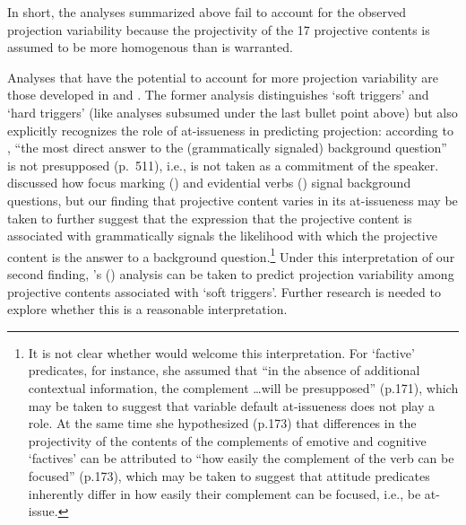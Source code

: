 \documentclass[11pt,fleqn]{article}
\newcommand{\6}{\mbox{$[\hspace*{-.6mm}[$}}
\newcommand{\9}{\mbox{$]\hspace*{-.6mm}]$}}
\newcommand{\citetpos}[1]{\citeauthor{#1}'s (\citeyear{#1})}
\begin{document}
In short, the analyses summarized above fail to account for the observed projection variability because the projectivity of the 17 projective contents is assumed to be more homogenous than is warranted. 

Analyses that have the potential to account for more projection variability are those developed in \citealt{abrusan2011} and \citealt{abrusan2016}. The former analysis distinguishes `soft triggers' and `hard triggers' (like analyses subsumed under the last bullet point above) but also explicitly recognizes the role of at-issueness in predicting projection: according to \citealt{abrusan2011}, ``the most direct answer to the (grammatically signaled) background question'' is not presupposed (p.\ 511), i.e., is not taken as a commitment of the speaker.  \citet{abrusan2011} discussed how focus marking (\citealt{beaver-belly}) and evidential verbs (\citealt{simons07}) signal background questions, but our finding that projective content varies in its at-issueness may be taken to further suggest that the expression that the projective content is associated with grammatically signals the likelihood with which the projective content is the answer to a background question.\footnote{It is not clear whether \citet{abrusan2016} would welcome this interpretation. For `factive' predicates, for instance, she assumed that ``in the absence of additional contextual information, the complement \ldots will be presupposed'' (p.171), which may be taken to suggest that variable default at-issueness does not play a role. At the same time she hypothesized (p.173) that differences in the projectivity of the contents of the complements of emotive and cognitive `factives' can be attributed to ``how easily the complement of the verb can be focused'' (p.173), which may be taken to suggest that attitude predicates inherently differ in how easily their complement can be focused, i.e., be at-issue.} Under this interpretation of our second finding, \citetpos{abrusan2011} analysis can be taken to predict projection variability among projective contents associated with `soft triggers'. Further research is needed to explore whether this is a reasonable interpretation.
\end{document}
